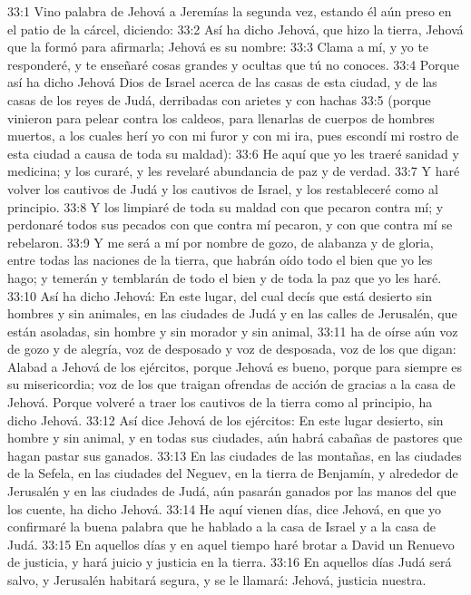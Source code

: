 33:1 Vino palabra de Jehová a Jeremías la segunda vez, estando él aún preso en el patio de la cárcel, diciendo: 
33:2 Así ha dicho Jehová, que hizo la tierra, Jehová que la formó para afirmarla; Jehová es su nombre: 
33:3 Clama a mí, y yo te responderé, y te enseñaré cosas grandes y ocultas que tú no conoces. 
33:4 Porque así ha dicho Jehová Dios de Israel acerca de las casas de esta ciudad, y de las casas de los reyes de Judá, derribadas con arietes y con hachas 
33:5 (porque vinieron para pelear contra los caldeos, para llenarlas de cuerpos de hombres muertos, a los cuales herí yo con mi furor y con mi ira, pues escondí mi rostro de esta ciudad a causa de toda su maldad): 
33:6 He aquí que yo les traeré sanidad y medicina; y los curaré, y les revelaré abundancia de paz y de verdad. 
33:7 Y haré volver los cautivos de Judá y los cautivos de Israel, y los restableceré como al principio. 
33:8 Y los limpiaré de toda su maldad con que pecaron contra mí; y perdonaré todos sus pecados con que contra mí pecaron, y con que contra mí se rebelaron. 
33:9 Y me será a mí por nombre de gozo, de alabanza y de gloria, entre todas las naciones de la tierra, que habrán oído todo el bien que yo les hago; y temerán y temblarán de todo el bien y de toda la paz que yo les haré. 
33:10 Así ha dicho Jehová: En este lugar, del cual decís que está desierto sin hombres y sin animales, en las ciudades de Judá y en las calles de Jerusalén, que están asoladas, sin hombre y sin morador y sin animal, 
33:11 ha de oírse aún voz de gozo y de alegría, voz de desposado y voz de desposada, voz de los que digan: Alabad a Jehová de los ejércitos, porque Jehová es bueno, porque para siempre es su misericordia; voz de los que traigan ofrendas de acción de gracias a la casa de Jehová. Porque volveré a traer los cautivos de la tierra como al principio, ha dicho Jehová. 
33:12 Así dice Jehová de los ejércitos: En este lugar desierto, sin hombre y sin animal, y en todas sus ciudades, aún habrá cabañas de pastores que hagan pastar sus ganados. 
33:13 En las ciudades de las montañas, en las ciudades de la Sefela, en las ciudades del Neguev, en la tierra de Benjamín, y alrededor de Jerusalén y en las ciudades de Judá, aún pasarán ganados por las manos del que los cuente, ha dicho Jehová. 
33:14 He aquí vienen días, dice Jehová, en que yo confirmaré la buena palabra que he hablado a la casa de Israel y a la casa de Judá. 
33:15 En aquellos días y en aquel tiempo haré brotar a David un Renuevo de justicia, y hará juicio y justicia en la tierra. 
33:16 En aquellos días Judá será salvo, y Jerusalén habitará segura, y se le llamará: Jehová, justicia nuestra. 
